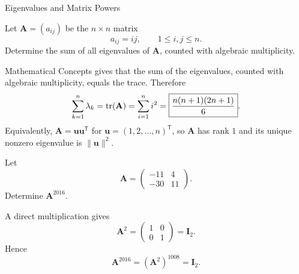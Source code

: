 \begin{expectedproblemgroup}{Eigenvalues and Matrix Powers}
        \begin{expectedsubproblem}
            Let $\mathbf{A}=(a_{ij})$ be the $n\times n$ matrix
            \[
                a_{ij}=ij,
                \qquad
                1\leq i,j\leq n.
            \]
            Determine the sum of all eigenvalues of $\mathbf{A}$, counted with
            algebraic multiplicity.
        \end{expectedsubproblem}

        \begin{expectedsubsolution}
            Mathematical Concepts gives that the sum of the eigenvalues,
            counted with algebraic multiplicity, equals the trace. Therefore
            \[
                \sum_{k=1}^{n}\lambda_k
                =
                \operatorname{tr}(\mathbf{A})
                =
                \sum_{i=1}^{n}i^2
                =
                \boxed{\frac{n(n+1)(2n+1)}{6}}.
            \]
            Equivalently, $\mathbf{A}=\mathbf{u}\mathbf{u}^{\mathsf T}$ for
            $\mathbf{u}=(1,2,\ldots,n)^{\mathsf T}$, so $\mathbf{A}$ has rank
            $1$ and its unique nonzero eigenvalue is $\|\mathbf{u}\|^2$.
        \end{expectedsubsolution}

        \begin{expectedsubproblem}
            Let
            \[
                \mathbf{A}
                =
                \begin{pmatrix}
                    -11 & 4\\
                    -30 & 11
                \end{pmatrix}.
            \]
            Determine $\mathbf{A}^{2016}$.
        \end{expectedsubproblem}

        \begin{expectedsubsolution}
            A direct multiplication gives
            \[
                \mathbf{A}^2
                =
                \begin{pmatrix}
                    1&0\\
                    0&1
                \end{pmatrix}
                =
                \mathbf{I}_2.
            \]
            Hence
            \[
                \mathbf{A}^{2016}
                =
                (\mathbf{A}^2)^{1008}
                =
                \boxed{\mathbf{I}_2}.
            \]
        \end{expectedsubsolution}

    \end{expectedproblemgroup}

